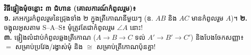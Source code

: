 \documentclass[a4paper,10pt]{article}
\newcommand{\en}[1]{{\TimesEn #1}}
\newcommand{\ang}[1]{\ensuremath{\angle #1}}
\newcommand{\cg}{\ensuremath{\cong}}
\begin{document}
\begin{tcolorbox}[
  enhanced, sharp corners, colback=white, colframe=black,
  boxrule=1.5pt, borderline={0.6pt}{2.2pt}{black},
  top=5pt, bottom=5pt, left=7pt, right=7pt
]
  \vspace{5pt}

  \begin{tcolorbox}[
    enhanced, sharp corners, colback=panelgray, colframe=black,
    boxrule=0.95pt, top=4pt, bottom=4pt, left=6pt, right=6pt, after skip=5pt
  ]
    \fontsize{8.6pt}{12.5pt}\selectfont
    \textbf{វិធីផ្ទៀងមុំចន្លោះ ៣ ជំហាន (គោលការណ៍កំពូលរួម)៖}\\[2pt]
    \textbf{១.} រកអក្សរកំពូលរួមនៃជ្រុងទាំង ២ ក្នុងត្រីកោណនីមួយៗ (ឧ. $AB$ និង $AC$ មានកំពូលរួម \textbf{$A$})។ \hspace{0.2cm}
    \textbf{២.} ចង្អុលអូសតាម \en{S--A--S}៖ មុំត្រូវតែជាកំពូលរួម $\ang{A}$ នោះ!\\
    \textbf{៣.} ផ្ទៀងលំដាប់កំពូលឆ្លងត្រីកោណ ($A\to B\to C$ ទល់ $A'\to B'\to C'$) និងបែងចែកសញ្ញា៖ \textbf{$=$} សម្រាប់ប្រវែង/រង្វាស់មុំ \hspace{0.2cm} និង \hspace{0.2cm} \textbf{$\cg$} សម្រាប់ត្រីកោណប៉ុនគ្នា!
  \end{tcolorbox}


\end{tcolorbox}
\end{document}
